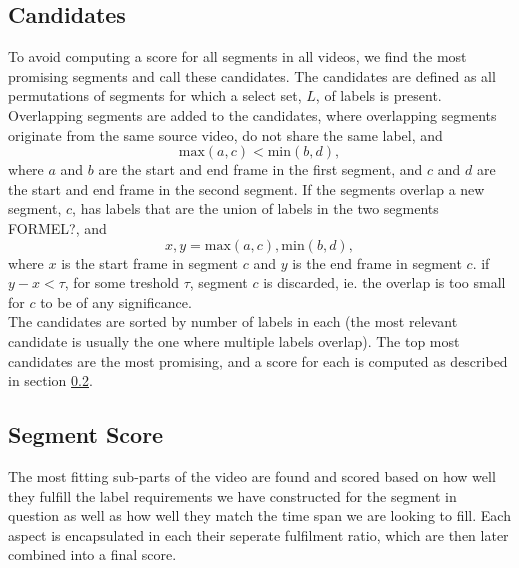 \subsection{Candidates}\label{sec:candidates}
%
To avoid computing a score for all segments in all videos, we find the most promising segments and call these candidates. The candidates are defined as all permutations of segments for which a select set, $L$, of labels is present.
Overlapping segments are added to the candidates, where overlapping segments originate from the same source video, do not share the same label, and 
%
\[
\text{max}(a, c) < \text{min}(b, d),
\]
%
where $a$ and $b$ are the start and end frame in the first segment, and $c$ and $d$ are the start and end frame in the second segment. If the segments overlap a new segment, $c$, has labels that are the union of labels in the two segments FORMEL?, and
%
\[
x,y = \text{max}(a, c), \text{min}(b, d),
\]
%
where $x$ is the start frame in segment $c$ and $y$ is the end frame in segment $c$. if $y-x < \tau$, for some treshold $\tau$, segment $c$ is discarded, ie. the overlap is too small for $c$ to be of any significance.\\
The candidates are sorted by number of labels in each (the most relevant candidate is usually the one where multiple labels overlap). The top most candidates are the most promising, and a score for each is computed as described in section \ref{sec:segment_score}.
%
%
\subsection{Segment Score}\label{sec:segment_score}
%
%
The most fitting sub-parts of the video are found and scored based on how well they fulfill the label requirements we have constructed for the segment in question as well as how well they match the time span we are looking to fill. Each aspect is encapsulated in each their seperate fulfilment ratio, which are then later combined into a final score.
%
